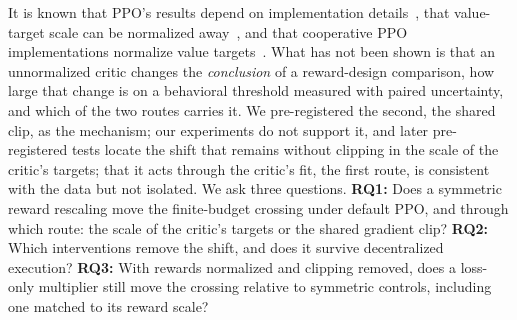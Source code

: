 It is known that PPO's results depend on implementation details~\citep{engstrom2020implementation,andrychowicz2021matters,henderson2018matters},
that value-target scale can be normalized away~\citep{vanhasselt2016popart}, and that cooperative PPO
implementations normalize value targets~\citep{yu2022surprising}. What has not been shown is that an
unnormalized critic changes the \emph{conclusion} of a reward-design comparison, how large that change is on a
behavioral threshold measured with paired uncertainty, and which of the two routes carries it. We pre-registered
the second, the shared clip, as the mechanism; our experiments do not support it, and later pre-registered tests
locate the shift that remains without clipping in the scale of the critic's targets; that it acts through the critic's fit, the first route, is
consistent with the data but not isolated. We ask three questions.
\textbf{RQ1:} Does a symmetric reward rescaling move the finite-budget crossing under default PPO, and through
which route: the scale of the critic's targets or the shared gradient clip?
\textbf{RQ2:} Which interventions remove the shift, and does it survive decentralized execution?
\textbf{RQ3:} With rewards normalized and clipping removed, does a loss-only multiplier still move the crossing
relative to symmetric controls, including one matched to its reward scale?

